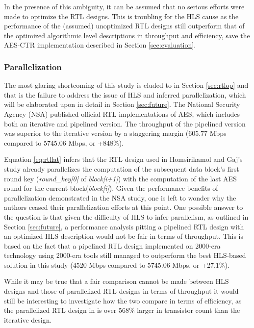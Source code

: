 \documentclass[12pt,journal,compsoc,onecolumn]{IEEEtran}
\begin{document}
In the presence of this ambiguity, it can be assumed that no serious efforts were made to optimize the RTL designs. This is troubling for the HLS cause as the performance of the (assumed) unoptimized RTL designs still outperform that of the optimized algorithmic level descriptions in throughput and efficiency, save the AES-CTR implementation described in Section \ref{sec:evaluation}.

\subsubsection{Parallelization}\label{sec:parallel}
The most glaring shortcoming of this study is eluded to in Section \ref{sec:rtlop} and that is the failure to address the issue of HLS and inferred parallelization, which will be elaborated upon in detail in Section \ref{sec:future}. The National Security Agency (NSA) published official RTL implementations of AES, which includes both an iterative and pipelined version\cite{nsa}. The throughput of the pipelined version was superior to the iterative version by a staggering margin (605.77 Mbps compared to 5745.06 Mbps, or +848\%)\cite{nsaweeks}.

Equation \ref{eq:rtllat} infers that the RTL design used in Homsirikamol and Gaj's study already parallelizes the computation of the subsequent data block's first round key (\emph{round\_key[0]} of \emph{block[i+1]}) with the computation of the last AES round for the current block(\emph{block[i]}). Given the performance benefits of parallelization demonstrated in the NSA study, one is left to wonder why the authors ceased their parallelization efforts at this point. One possible answer to the question is that given the difficulty of HLS to infer parallelism, as outlined in Section \ref{sec:future}, a performance analysis pitting a pipelined RTL design with an optimized HLS description would not be fair in terms of throughput. This is based on the fact that a pipelined RTL design implemented on 2000-era technology using 2000-era tools still managed to outperform the best HLS-based solution in this study (4520 Mbps compared to 5745.06 Mbps\cite{nsaweeks}, or +27.1\%). 

While it may be true that a fair comparison cannot be made between HLS designs and those of parallelized RTL designs in terms of throughput it would still be interesting to investigate how the two compare in terms of efficiency, as the parallelized RTL design in \cite{nsaweeks} is over 568\% larger in transistor count than the iterative design. 
\end{document}
